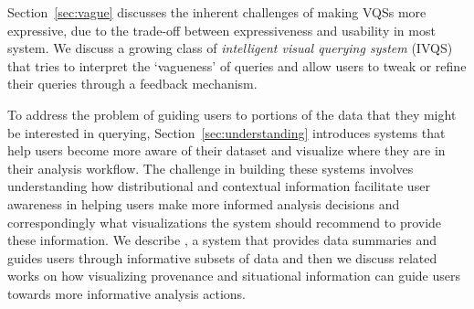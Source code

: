 \par Section~\ref{sec:vague} discusses the inherent challenges of making VQSs more expressive, due to the trade-off between expressiveness and usability in most system. We discuss a growing class of \textit{intelligent visual querying system} (IVQS) that tries to interpret the `vagueness' of queries and allow users to tweak or refine their queries through a feedback mechanism.
\par To address the problem of guiding users to portions of the data that they might be interested in querying, Section~\ref{sec:understanding} introduces systems that help users become more aware of their dataset and visualize where they are in their analysis workflow. The challenge in building these systems involves understanding how distributional and contextual information facilitate user awareness in helping users make more informed analysis decisions and correspondingly what visualizations the system should recommend to provide these information. We describe \sbd, a system that provides data summaries and guides users through informative subsets of data and then we discuss related works on how visualizing provenance and situational information can guide users towards more informative analysis actions.
